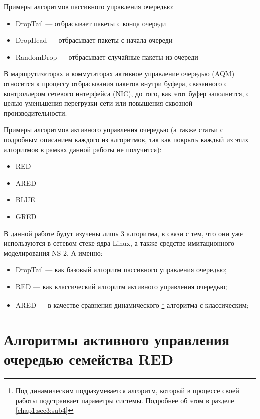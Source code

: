 Примеры алгоритмов пассивного управления очередью:

\begin{itemize}
  \item DropTail --- отбрасывает пакеты с конца очереди
  \item DropHead --- отбрасывает пакеты с начала очереди 
  \item RandomDrop --- отбрасывает случайные пакеты из очереди 
\end{itemize}


В маршрутизаторах и коммутаторах активное управление очередью (AQM) \cite{aqm} относится к
процессу отбрасывания пакетов внутри буфера, связанного с контроллером сетевого
интерфейса (NIC), до того, как этот буфер заполнится, с целью уменьшения
перегрузки сети или повышения сквозной производительности.

Примеры алгоритмов активного управления очередью (а также статьи с подробным
описанием каждого из алгоритмов, так как покрыть каждый из этих алгоритмов в рамках данной работы не получится):

\begin{itemize}
    \item RED \cite{RandomEarlyDeFloyd1993, ASelfConfigurFeng1999}
    \item ARED \cite{ARED_1, ARED_2, ARED_3, AnalysisOfAdaLaR2003} 
    \item BLUE \cite{blue}
    \item GRED \cite{RevisitingTheHamadn2019}
\end{itemize}

В данной работе будут изучены лишь 3 алгоритма, в связи с тем, что они уже
используются в сетевом стеке ядра Linux, а также средстве имитационного
моделирования NS-2. А именно:

\begin{itemize}
  \item DropTail --- как базовый алгоритм пассивного управления очередью;
  \item RED --- как классический алгоритм активного управления очередью;
  \item ARED --- в качестве сравнения динамического \footnote{Под динамическим подразумевается алгоритм, который в процессе своей работы подстраивает параметры системы. Подробнее об этом в разделе \ref{chap1:sec3:sub4}} алгоритма с классическим;
\end{itemize}

\section{Алгоритмы активного управления очередью семейства RED}
\label{chap1:sec3}

